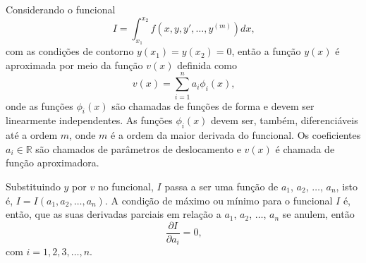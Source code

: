 \documentclass[
	12pt,				%
	openright,			%
    twoside,			%
	a4paper,			%
	english,			%
	french,				%
	spanish,			%
	brazil				%
	]{abntex2}
\numberwithin{lema}{chapter}
\numberwithin{teorema}{chapter}
\numberwithin{definicao}{chapter}
\numberwithin{exemplo}{chapter}
\numberwithin{figure}{chapter}
\begin{document}
Considerando o funcional
$$
	I=\int_{x_1}^{x_2} f(x,y,y',\dots,y^{(m)})dx
	\text{,}
$$
com as condições de contorno $y(x_1)=y(x_2)=0$, então a função $y(x)$ é aproximada por meio da função $v(x)$ definida como
$$
	v(x) = \sum_{i=1}^n a_i \phi _i (x)
	\text{,}
$$
onde as funções $\phi_i(x)$ são chamadas de funções de forma e devem ser linearmente independentes. As funções $\phi_i(x)$ devem ser, também, diferenciáveis até a ordem $m$, onde $m$ é a ordem da maior derivada do funcional. Os coeficientes $a_i \in \mathbb{R}$ são chamados de parâmetros de deslocamento e $v(x)$ é chamada de função aproximadora.

Substituindo $y$ por $v$ no funcional, $I$ passa a ser uma função de $a_1$, $a_2$, $\dots$, $a_n$, isto é, $I=I(a_1, a_2, \dots, a_n)$. A condição de máximo ou mínimo para o funcional $I$ é, então, que as suas derivadas parciais em relação a $a_1$, $a_2$, $\dots$, $a_n$ se anulem, então
$$
	\frac{\partial I}{\partial a_i} = 0
	\text{,}
$$
com $i=1, 2, 3, \dots, n$.
\end{document}
